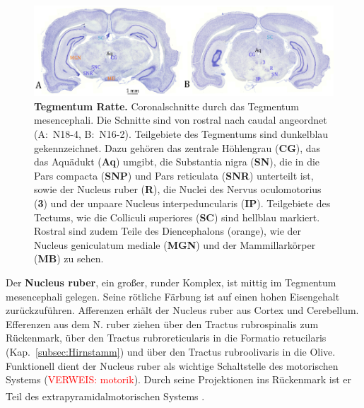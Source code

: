 \documentclass[12pt,a4paper,pdftex]{article}
\begin{document}
\begin{figure}[H]
    \centering
    \includegraphics[width=\textwidth]{pictures/Bilder_Jule/Ratte/tegmentum_mesenc.png}
    \caption[Tegmentum Ratte]{\textbf{Tegmentum Ratte.} Coronalschnitte durch das Tegmentum mesencephali. Die Schnitte sind von rostral nach caudal angeordnet (A:~N18-4, B:~N16-2). Teilgebiete des Tegmentums sind dunkelblau gekennzeichnet. Dazu gehören das zentrale Höhlengrau (\textbf{CG}), das das Aquädukt (\textbf{Aq}) umgibt, die Substantia nigra (\textbf{SN}), die in die Pars compacta (\textbf{SNP}) und Pars reticulata (\textbf{SNR}) unterteilt ist, sowie der Nucleus ruber (\textbf{R}), die Nuclei des Nervus oculomotorius (\textbf{3}) und der unpaare Nucleus interpeduncularis (\textbf{IP}). Teilgebiete des Tectums, wie die Colliculi superiores (\textbf{SC}) sind hellblau markiert. Rostral sind zudem Teile des Diencephalons (orange), wie der Nucleus geniculatum mediale (\textbf{MGN}) und der Mammillarkörper (\textbf{MB}) zu sehen.}
    \label{fig:tegmentum_mesenc}
\end{figure}{}

\noindent Der \textbf{Nucleus ruber}, ein großer, runder Komplex, ist mittig im Tegmentum mesencephali gelegen. Seine rötliche Färbung ist auf einen hohen Eisengehalt zurückzuführen. Afferenzen erhält der Nucleus ruber aus Cortex und Cerebellum. Efferenzen aus dem N. ruber ziehen über den Tractus rubrospinalis zum Rückenmark, über den Tractus rubroreticularis in die Formatio retucilaris (Kap.~\ref{subsec:Hirnstamm}) und über den Tractus rubroolivaris in die Olive. Funktionell dient der Nucleus ruber als wichtige Schaltstelle des motorischen Systems (\textcolor{red}{VERWEIS: motorik}). Durch seine Projektionen ins Rückenmark ist er Teil des extrapyramidalmotorischen Systems \textsuperscript{\cite[6]{trepel2011neuroanatomie}}.\\
\end{document}
